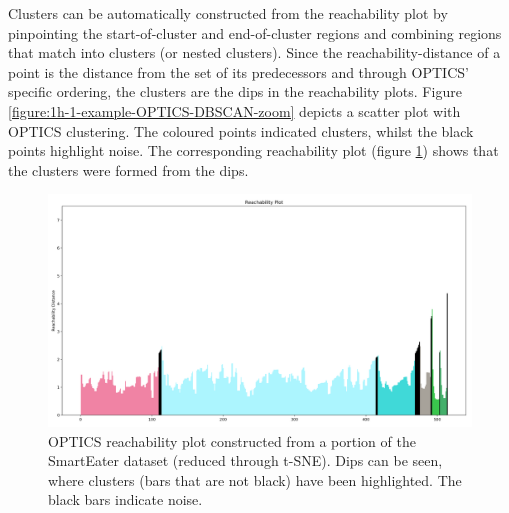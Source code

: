 Clusters can be automatically constructed from the reachability plot by pinpointing the start-of-cluster and end-of-cluster regions and combining regions that match into clusters (or nested clusters). Since the reachability-distance of a point is the distance from the set of its predecessors and through OPTICS' specific ordering, the clusters are the dips in the reachability plots. Figure \ref{figure:1h-1-example-OPTICS-DBSCAN-zoom} depicts a scatter plot with OPTICS clustering. The coloured points indicated clusters, whilst the black points highlight noise. The corresponding reachability plot (figure \ref{figure:1h-1-example-reachabilityPlot-DBSCAN-zoom}) shows that the clusters were formed from the dips.


\begin{figure}
  \centering
  \includegraphics[width=1\textwidth]{./images/OPTICS/1h-1-example-reachabilityPlot-DBSCAN-zoom.png}
  \caption{OPTICS reachability plot constructed from a portion of the SmartEater dataset (reduced through t-SNE). Dips can be seen, where clusters (bars that are not black) have been highlighted. The black bars indicate noise.}
  \label{figure:1h-1-example-reachabilityPlot-DBSCAN-zoom}
\end{figure}

